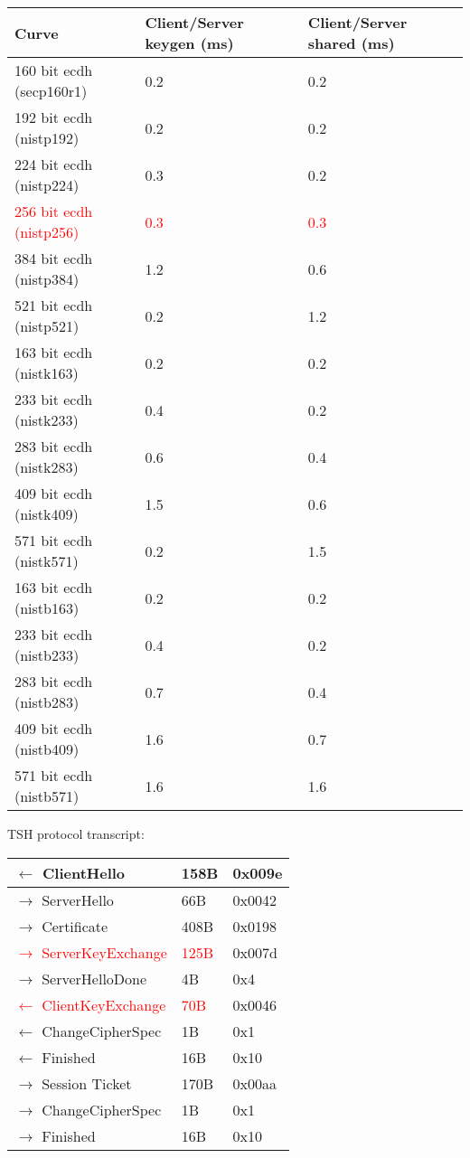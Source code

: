 \documentclass[12pt]{article}
\begin{document}
\begin{center}
    \begin{tabular}{| l | l | l |}
    \hline
    Curve & Client/Server keygen (ms) & Client/Server shared (ms) \\ \hline
    160 bit ecdh (secp160r1)  & 0.2   & 0.2 \\ \hline
    192 bit ecdh (nistp192)   & 0.2   & 0.2 \\ \hline
    224 bit ecdh (nistp224)   & 0.3   & 0.2 \\ \hline
    \textcolor{red}{256 bit ecdh (nistp256)}   & \textcolor{red}{0.3}   & \textcolor{red}{0.3} \\ \hline
    384 bit ecdh (nistp384)   & 1.2   & 0.6 \\ \hline
    521 bit ecdh (nistp521)   & 0.2   & 1.2 \\ \hline
    163 bit ecdh (nistk163)   & 0.2   & 0.2 \\ \hline
    233 bit ecdh (nistk233)   & 0.4   & 0.2 \\ \hline
    283 bit ecdh (nistk283)   & 0.6   & 0.4 \\ \hline
    409 bit ecdh (nistk409)   & 1.5   & 0.6 \\ \hline
    571 bit ecdh (nistk571)   & 0.2   & 1.5 \\ \hline
    163 bit ecdh (nistb163)   & 0.2   & 0.2 \\ \hline
    233 bit ecdh (nistb233)   & 0.4   & 0.2 \\ \hline
    283 bit ecdh (nistb283)   & 0.7   & 0.4 \\ \hline
    409 bit ecdh (nistb409)   & 1.6   & 0.7 \\ \hline
    571 bit ecdh (nistb571)   & 1.6   & 1.6 \\ \hline
    \end{tabular}
\end{center}

TSH protocol transcript:
\begin{center}
    \begin{tabular}{| l | l | l |}
    \hline
    $\leftarrow$ ClientHello & 158B & 0x009e\\ \hline
    $\rightarrow$ ServerHello & 66B & 0x0042\\ \hline
    $\rightarrow$ Certificate & 408B & 0x0198\\ \hline
    \textcolor{red}{$\rightarrow$ ServerKeyExchange} & \textcolor{red}{125B} & 0x007d\\ \hline
    $\rightarrow$ ServerHelloDone & 4B & 0x4\\ \hline
    \textcolor{red}{$\leftarrow$ ClientKeyExchange} & \textcolor{red}{70B} & 0x0046\\ \hline
    $\leftarrow$ ChangeCipherSpec & 1B & 0x1\\ \hline
    $\leftarrow$ Finished & 16B & 0x10\\ \hline
    $\rightarrow$ Session Ticket & 170B & 0x00aa\\ \hline
    $\rightarrow$ ChangeCipherSpec & 1B & 0x1\\ \hline
    $\rightarrow$ Finished & 16B & 0x10\\ \hline
    \end{tabular}
\end{center}
\end{document}
